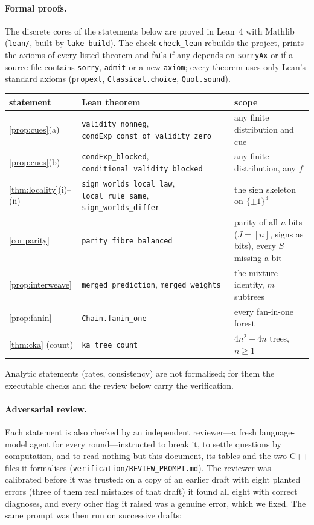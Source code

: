 \documentclass[11pt]{article}
\theoremstyle{definition}
\theoremstyle{remark}
\begin{document}
\paragraph{Formal proofs.}
The discrete cores of the statements below are proved in Lean~4 with Mathlib
\citep{moura2021lean4,mathlib2020} (\texttt{lean/}, built by \texttt{lake build}).  The
check \texttt{check\_lean} rebuilds the project, prints the axioms of every listed theorem and
fails if any depends on \texttt{sorryAx} or if a source file contains \texttt{sorry},
\texttt{admit} or a new \texttt{axiom}; every theorem uses only Lean's standard axioms
(\texttt{propext}, \texttt{Classical.choice}, \texttt{Quot.sound}).
\begin{center}\small
\begin{tabular}{@{}lp{5.6cm}p{6.2cm}@{}}\toprule
statement & Lean theorem & scope\\\midrule
\cref{prop:cues}(a) & \texttt{validity\_nonneg}, \texttt{condExp\_const\_of\_validity\_zero} & any finite distribution and cue\\
\cref{prop:cues}(b) & \texttt{condExp\_blocked}, \texttt{conditional\_validity\_blocked} & any finite distribution, any $f$\\
\cref{thm:locality}(i)--(ii) & \texttt{sign\_worlds\_local\_law}, \texttt{local\_rule\_same}, \texttt{sign\_worlds\_differ} & the sign skeleton on $\{\pm1\}^3$\\
\cref{cor:parity} & \texttt{parity\_fibre\_balanced} & parity of all $n$ bits ($J=[n]$, signs as bits), every $S$ missing a bit\\
\cref{prop:interweave} & \texttt{merged\_prediction}, \texttt{merged\_weights} & the mixture identity, $m$ subtrees\\
\cref{prop:fanin} & \texttt{Chain.fanin\_one} & every fan-in-one forest\\
\cref{thm:cka} (count) & \texttt{ka\_tree\_count} & $4n^2+4n$ trees, $n\ge1$\\
\bottomrule
\end{tabular}
\end{center}
Analytic statements (rates, consistency) are not formalised; for them the executable
checks and the review below carry the verification.

\paragraph{Adversarial review.}
Each statement is also checked by an independent reviewer---a fresh language-model agent
for every round---instructed to break it, to settle questions by computation, and to
read nothing but this document, its tables and the two C++ files it formalises
(\texttt{verification/REVIEW\_PROMPT.md}).  The reviewer was calibrated before it was
trusted: on a copy of an earlier draft with eight planted errors (three of them real
mistakes of that draft) it found all eight with correct diagnoses, and every other flag it
raised was a genuine error, which we fixed.  The same prompt was then run on successive
drafts:
\end{document}
